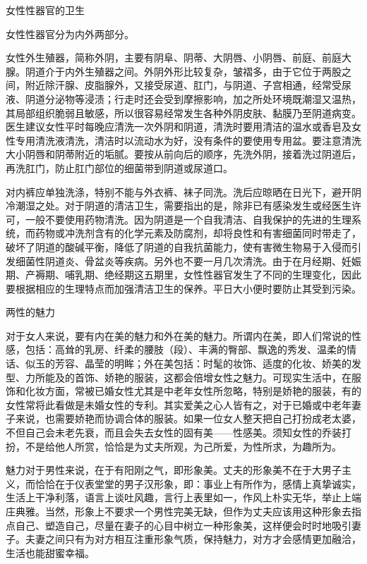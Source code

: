\documentclass[12pt,UTF8]{ctexbook}
\begin{document}
女性性器官的卫生


女性性器官分为内外两部分。

女性外生殖器，简称外阴，主要有阴阜、阴蒂、大阴唇、小阴唇、前庭、前庭大腺。阴道介于内外生殖器之间。外阴外形比较复杂，皱褶多，由于它位于两股之间，附近除汗腺、皮脂腺外，又接受尿道、肛门，与阴道、子宫相通，经常受尿液、阴道分泌物等浸渍；行走时还会受到摩擦影响，加之所处环境既潮湿又温热，其局部组织脆弱且敏感，所以很容易经常发生各种外阴皮肤、黏膜乃至阴道病变。医生建议女性平时每晚应清洗一次外阴和阴道，清洗时要用清洁的温水或香皂及女性专用清洗液清洗，清洁时以流动水为好，没有条件的要使用专用盆。要注意清洗大小阴唇和阴蒂附近的垢腻。要按从前向后的顺序，先洗外阴，接着洗过阴道后，再洗肛门，防止肛门部位的细菌带到阴道或尿道口。

对内裤应单独洗涤，特别不能与外衣裤、袜子同洗。洗后应晾晒在日光下，避开阴冷潮湿之处。对于阴道的清洁卫生，需要指出的是，除非已有感染发生或经医生许可，一般不要使用药物清洗。因为阴道是一个自我清洁、自我保护的先进的生理系统，而药物或冲洗剂含有的化学元素及防腐剂，却将良性和有害细菌同时带走了，破坏了阴道的酸碱平衡，降低了阴道的自我抗菌能力，使有害微生物易于入侵而引发细菌性阴道炎、骨盆炎等疾病。另外也不要一月几次清洗。由于在月经期、妊娠期、产褥期、哺乳期、绝经期这五期里，女性性器官发生了不同的生理变化，因此要根据相应的生理特点而加强清洁卫生的保养。平日大小便时要防止其受到污染。





两性的魅力


对于女人来说，要有内在美的魅力和外在美的魅力。所谓内在美，即人们常说的性感，包括：高耸的乳房、纤柔的腰肢（段）、丰满的臀部、飘逸的秀发、温柔的情话、似玉的芳容、晶莹的明眸；外在美包括：时髦的妆饰、适度的化妆、娇美的发型、力所能及的首饰、娇艳的服装，这都会倍增女性之魅力。可现实生活中，在服饰和化妆方面，常被已婚女性尤其是中老年女性所忽略，特别是娇艳的服装，有的女性常将此看做是未婚女性的专利。其实爱美之心人皆有之，对于已婚或中老年妻子来说，也需要娇艳而协调合体的服装。如果一位女人整天把自己打扮成老太婆，不但自己会未老先衰，而且会失去女性的固有美——性感美。须知女性的乔装打扮，不是给他人所赏，恰恰是为丈夫所观，为己所爱，为性所求，为趣所为。

魅力对于男性来说，在于有阳刚之气，即形象美。丈夫的形象美不在于大男子主义，而恰恰在于仪表堂堂的男子汉形象，即：事业上有所作为，感情上真挚诚实，生活上干净利落，语言上谈吐风趣，言行上表里如一，作风上朴实无华，举止上端庄典雅。当然，形象上不要求一个男性完美无缺，但作为丈夫应该用这种形象去指点自己、塑造自己，尽量在妻子的心目中树立一种形象美，这样便会时时地吸引妻子。夫妻之间只有为对方相互注重形象气质，保持魅力，对方才会感情更加融洽，生活也能甜蜜幸福。
\end{document}
